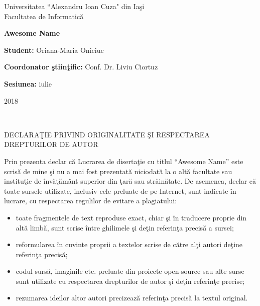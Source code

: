 \documentclass[11pt]{report}
\theoremstyle{plain}
\theoremstyle{definition}
\theoremstyle{definition}
\theoremstyle{proposition}
\begin{document}
\begin{titlepage}

\begin{center}
Universitatea ``Alexandru Ioan Cuza" din Iaşi\\
Facultatea de Informatică\\
\end{center}

\vspace{85mm}
 
\begin{center}
\begin{Huge}
\textbf{Awesome Name}
\end{Huge}
\end{center}
 
\vspace{60mm}

\textbf{Student:} Oriana-Maria Oniciuc

\textbf{Coordonator ştiinţific:} Conf. Dr. Liviu Ciortuz

\vfill

\begin{center}
\textbf{Sesiunea:} iulie

2018
\end{center}

\end{titlepage}
\newpage

\


\vspace{10mm}
\begin{large}
\begin{center}
DECLARAŢIE PRIVIND ORIGINALITATE ŞI RESPECTAREA DREPTURILOR DE AUTOR
\end{center}
\end{large}

\vspace{20mm}

Prin prezenta declar că Lucrarea de disertaţie cu titlul ``Awesome Name” este scrisă de mine şi nu a mai fost prezentată niciodată la o altă facultate sau instituţie de învăţământ superior din ţară sau străinătate. De asemenea, declar că toate sursele utilizate, inclusiv cele preluate de pe Internet, sunt indicate în lucrare, cu respectarea regulilor de evitare a plagiatului:

\begin{itemize}
\item toate fragmentele de text reproduse exact, chiar şi în traducere proprie din altă limbă, sunt scrise între ghilimele şi deţin referinţa precisă a sursei;
\item reformularea în cuvinte proprii a textelor scrise de către alţi autori deţine referinţa precisă;
\item codul sursă, imaginile etc. preluate din proiecte open-source sau alte surse sunt utilizate cu respectarea drepturilor de autor şi deţin referinţe precise; 
\item rezumarea ideilor altor autori precizează referinţa precisă la textul original.

\end{itemize}
\end{document}
